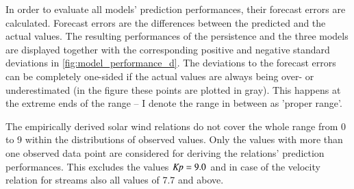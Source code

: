 In order to evaluate all models' prediction performances, their forecast errors are calculated. Forecast errors are the differences between the predicted and the actual values. The resulting performances of the persistence and the three models are displayed together with the corresponding positive and negative standard deviations in \autoref{fig:model_performance_d}. The deviations to the forecast errors can be completely one-sided if the actual \Kp{} values are always being over- or underestimated (in the figure these points are plotted in gray). This happens at the extreme ends of the \Kp{} range -- I denote the range in between as 'proper range'.
\begin{figure}[htb]
\end{figure}

The empirically derived solar wind relations do not cover the whole \Kp{} range from 0 to 9 within the distributions of observed values. Only the \Kp{} values with more than one observed data point are considered for deriving the relations' prediction performances. This excludes the values $\text{\textit{Kp}} = 9.0$ and in case of the velocity relation for streams also all values of \num{7.7} and above.

